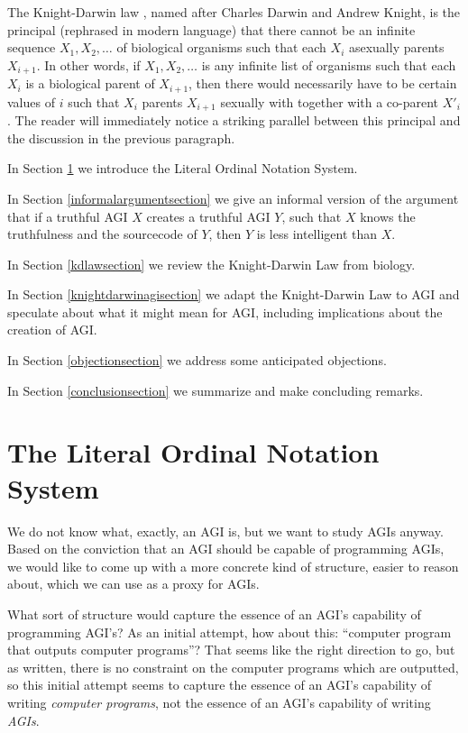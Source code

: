 \documentclass[runningheads]{llncs}
\begin{document}
The Knight-Darwin law \cite{darwin1898knight}, named after Charles Darwin
and Andrew Knight, is the
principal (rephrased in modern language) that there cannot be an infinite
sequence $X_1,X_2,\ldots$ of biological organisms such that each $X_i$ asexually
parents $X_{i+1}$. In other words, if $X_1,X_2,\ldots$ is any infinite list of
organisms such that each $X_i$ is a biological parent of $X_{i+1}$, then there
would necessarily have to be certain values of $i$ such that
$X_i$ parents $X_{i+1}$ sexually with together with a co-parent $X'_{i}$.
The reader will immediately notice a striking parallel between
this principal and the discussion in the previous paragraph.

In Section \ref{notationsystemsection} we introduce the Literal Ordinal Notation
System.

In Section \ref{informalargumentsection} we give an informal version of the
argument that if a truthful AGI $X$ creates a truthful AGI $Y$, such that $X$
knows the truthfulness and the sourcecode of $Y$, then $Y$ is less intelligent
than $X$.

In Section \ref{kdlawsection} we review the Knight-Darwin Law from biology.

In Section \ref{knightdarwinagisection} we adapt the Knight-Darwin Law to AGI
and speculate about what it might mean for AGI, including implications about
the creation of AGI.

In Section \ref{objectionsection} we address some anticipated objections.

In Section \ref{conclusionsection} we summarize and make concluding remarks.


\section{The Literal Ordinal Notation System}
\label{notationsystemsection}

We do not know what, exactly, an AGI is, but we want to study AGIs anyway.
Based on the conviction that an AGI should be capable of programming AGIs,
we would like to come up with a more concrete kind of structure, easier to reason
about, which we can use as a proxy for AGIs.

What sort of structure would capture the essence of an AGI's capability
of programming AGI's? As an initial attempt, how about this: ``computer
program that outputs computer programs''? That seems like the right direction
to go, but as written, there is no constraint on the computer programs which
are outputted, so this initial attempt seems to capture the essence of an
AGI's capability of writing \emph{computer programs}, not the essence of an
AGI's capability of writing \emph{AGIs}.
\end{document}
